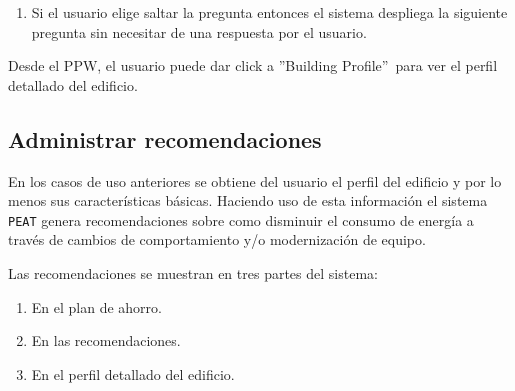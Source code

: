 \begin{usecase}
{\begin{enumerate}
\begin{enumerate}
\begin{enumerate}[i.]
          son recalculadas.
        \item El sistema despliega un indicador de progreso mientras
          se recalculan las recomendaciones.
        \item Al finalizar el refinamiento el orden de las preguntas
          o los valores del plan de ahorro deben ser actualizados, esto
          debe hacerse sin necesitar una recarga completa de la pagina.
        \end{enumerate}
      \item El sistema despliega la siguiente pregunta.
      \item El sistema persiste la respuesta dada.
      \end{enumerate}
    \item Si el usuario elige saltar la pregunta entonces el sistema
      despliega la siguiente pregunta sin necesitar de una respuesta por el usuario.
    \end{enumerate}
  \item Desde el PPW, el usuario puede dar click a ''Building Profile''\ para ver
    el perfil detallado del edificio.
  }
\end{usecase}

\subsection{Administrar recomendaciones}

En los casos de uso anteriores se obtiene del usuario el perfil del edificio
y por lo menos sus características básicas. Haciendo uso de esta información
el sistema \texttt{PEAT} genera recomendaciones sobre como disminuir el consumo
de energía a través de cambios de comportamiento y/o modernización de equipo.

Las recomendaciones se muestran en tres partes del sistema:
\begin{enumerate}
\item En el plan de ahorro.
\item En las recomendaciones.
\item En el perfil detallado del edificio.
\end{enumerate}

